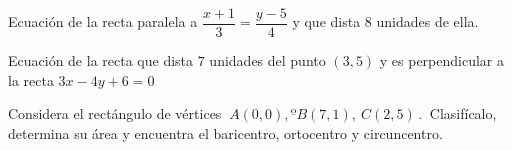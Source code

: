 \vspace{-8mm}
\begin{flushright}
\begin{footnotesize} \textcolor{gris}{}	\end{footnotesize}
\end{flushright}


\begin{mipropuesto}

Ecuación de la recta paralela a $\dfrac{x+1}{3}=\dfrac{y-5}{4}$ y que dista $8$ unidades de ella.

\end{mipropuesto}

\vspace{-8mm}
\begin{flushright}
\begin{footnotesize} \textcolor{gris}{}	\end{footnotesize}
\end{flushright}


\begin{mipropuesto}

Ecuación de la recta que dista $7$ unidades del punto $(3,5)$ y es perpendicular a la recta $3x-4y+6=0$

\end{mipropuesto}

\vspace{-8mm}
\begin{flushright}
\begin{footnotesize} \textcolor{gris}{}	\end{footnotesize}
\end{flushright}

\begin{mipropuesto}

Considera el rectángulo de vértices $\ A(0,0),º B(7,1),\ C(2,5)\, . \ $ Clasifícalo, determina su área y encuentra el baricentro, ortocentro y circuncentro.

\end{mipropuesto}

\vspace{-8mm}
\begin{flushright}
\begin{footnotesize} \textcolor{gris}{}	\end{footnotesize}
\end{flushright}



